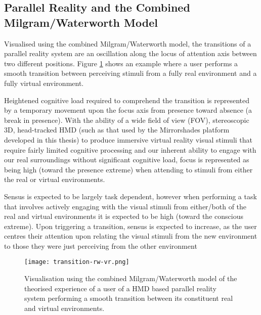 \subsection{Parallel Reality and the Combined Milgram/Waterworth Model}
Visualised using the combined Milgram/Waterworth model, the transitions of a parallel reality system are an oscillation along the locus of attention axis between two different positions. Figure \ref{focus-locus-sensus-with-virtuality-continuum-with-transition} shows an example where a user performs a smooth transition between perceiving stimuli from a fully real environment and a fully virtual environment.

Heightened cognitive load required to comprehend the transition is represented by a temporary movement upon the focus axis from presence toward absence (a break in presence). With the ability of a wide field of view (FOV), stereoscopic 3D, head-tracked HMD (such as that used by the Mirrorshades platform developed in this thesis) to produce immersive virtual reality visual stimuli that require fairly limited cognitive processing and our inherent ability to engage with our real surroundings without significant cognitive load, focus is represented as being high (toward the presence extreme) when attending to stimuli from either the real or virtual environments.

Sensus is expected to be largely task dependent, however when performing a task that involves actively engaging with the visual stimuli from either/both of the real and virtual environments it is expected to be high (toward the conscious extreme). Upon triggering a transition, sensus is expected to increase, as the user centres their attention upon relating the visual stimuli from the new environment to those they were just perceiving from the other environment



\begin{figure}[h]
	\begin{center}
		\texttt{[image: transition-rw-vr.png]}
		\caption{Visualisation using the combined Milgram/Waterworth model of the theorised experience of a user of a HMD based parallel reality system performing a smooth transition between its constituent real and virtual environments.}
		\label{focus-locus-sensus-with-virtuality-continuum-with-transition}
	\end{center}	
\end{figure}

